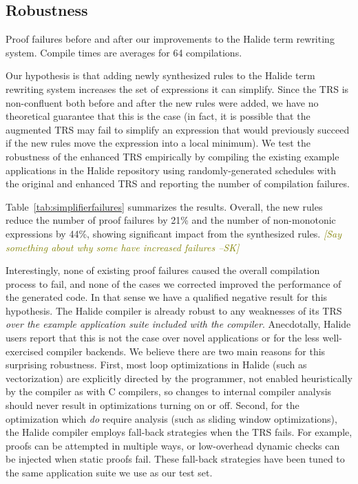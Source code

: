 \documentclass[sigplan,10pt,review,anonymous]{acmart}\settopmatter{printfolios=true,printccs=false,printacmref=false}
\newcommand{\sak}[1]{\textcolor{olive}{\textit{[{#1} --SK]}}}
\begin{document}
\subsection{Robustness}
\begin{table}[!ht]
  \caption{Proof failures before and after our improvements to the Halide term rewriting system.
    Compile times are averages for 64 compilations.}
  \label{tab:simplifierfailures}
  \small
  
\end{table}

Our hypothesis is that adding newly synthesized rules to the Halide
term rewriting system increases the set of expressions it can simplify. Since the
TRS is non-confluent both before and after the new rules were added, we
have no theoretical guarantee that this is the case (in fact, it is possible
that the augmented TRS may fail to simplify an expression that would
previously succeed if the new rules move the expression into a local
minimum). We test the robustness of the enhanced TRS empirically by
compiling the existing example applications in the Halide repository
using randomly-generated schedules with the original and enhanced TRS
and reporting the number of compilation failures.

Table~\ref{tab:simplifierfailures} summarizes the results.  Overall, the new rules
reduce the number of proof failures by 21\% and the number of non-monotonic expressions
by 44\%, showing significant impact from the synthesized rules. \sak{Say something about
  why some have increased failures}

Interestingly, none of existing proof failures caused the overall compilation process to fail, and none of the cases we corrected improved the performance of the generated code. In that sense we have a qualified negative result for this hypothesis. The Halide compiler is already robust to any weaknesses of its TRS \emph{over the example application suite included with the compiler}. Anecdotally, Halide users report that this is not the case over novel applications or for the less well-exercised compiler backends. We believe there are two main reasons for this surprising robustness. First, most loop optimizations in Halide (such as vectorization) are explicitly directed by the programmer, not enabled heuristically by the compiler as with C compilers, so changes to internal compiler analysis should never result in optimizations turning on or off. Second, for the optimization which \emph{do} require analysis (such as sliding window optimizations), the Halide compiler employs fall-back strategies when the TRS fails. For example, proofs can be attempted in multiple ways, or low-overhead dynamic checks can be injected when static proofs fail. These fall-back strategies have been tuned to the same application suite we use as our test set.
\end{document}
